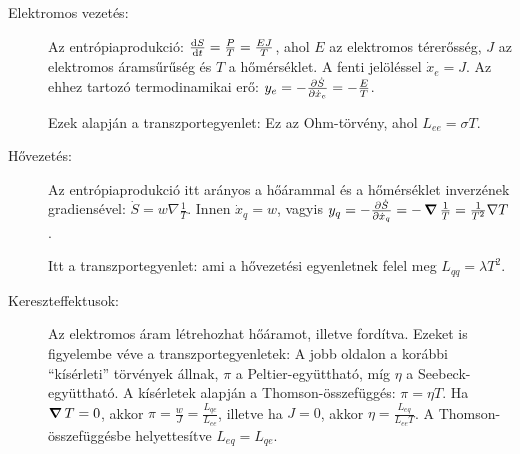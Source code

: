    \begin{description}
    \item[Elektromos vezetés:] Az entrópiaprodukció: $\frac{\mathrm{d} S}{\mathrm{d} t}=\frac{P}{T}=\frac{EJ}{T}$, ahol $E$ az elektromos térerősség, $J$ az elektromos áramsűrűség és $T$ a hőmérséklet. A fenti jelöléssel $\dot x_e=J$. Az ehhez tartozó termodinamikai erő: $y_e=-\frac{\partial \dot S}{\partial \dot x_e}=-\frac{E}{T}$.
    
    Ezek alapján a transzportegyenlet: 
    Ez az Ohm-törvény, ahol $L_{ee}=\sigma T$.
    
    \item[Hővezetés: ] Az entrópiaprodukció itt arányos a hőárammal és a hőmérséklet inverzének gradiensével: $\dot S=w\nabla\frac{1}{T}$. Innen $\dot x_{q}=w$, vagyis $y_q=-\frac{\partial \dot S}{\partial \dot x_{q}}=-\mathop{\boldsymbol{\nabla}}\nolimits\frac{1}{T}=\frac{1}{T^2}\nabla T$.
    
    Itt a transzportegyenlet:
    ami a hővezetési egyenletnek felel meg $L_{qq}=\lambda T^2$.
    
    \item[Kereszteffektusok: ] Az elektromos áram létrehozhat hőáramot, illetve fordítva. Ezeket is figyelembe véve a transzportegyenletek:
    A jobb oldalon a korábbi ``kísérleti'' törvények állnak, $\pi$ a Peltier-együttható, míg $\eta$ a Seebeck-együttható. A kísérletek alapján a Thomson-összefüggés: $\pi=\eta T$. Ha $\mathop{\boldsymbol{\nabla}}\nolimits T=0$, akkor $\pi=\frac{w}{J}=\frac{L_{qe}}{L_{ee}}$, illetve ha $J=0$, akkor $\eta=\frac{L_{eq}}{L_{ee}T}$. A Thomson-összefüggésbe helyettesítve $L_{eq}=L_{qe}$.
   \end{description}
